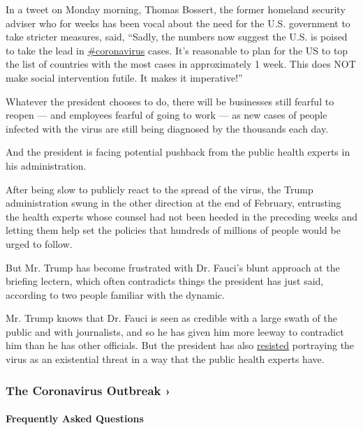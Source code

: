 In a tweet on Monday morning, Thomas Bossert, the former homeland
security adviser who for weeks has been vocal about the need for the
U.S. government to take stricter measures, said, ``Sadly, the numbers
now suggest the U.S. is poised to take the lead in
\href{https://twitter.com/hashtag/coronavirus?src=hashtag_click}{\#coronavirus}
cases. It's reasonable to plan for the US to top the list of countries
with the most cases in approximately 1 week. This does NOT make social
intervention futile. It makes it imperative!''

Whatever the president chooses to do, there will be businesses still
fearful to reopen --- and employees fearful of going to work --- as new
cases of people infected with the virus are still being diagnosed by the
thousands each day.

And the president is facing potential pushback from the public health
experts in his administration.

After being slow to publicly react to the spread of the virus, the Trump
administration swung in the other direction at the end of February,
entrusting the health experts whose counsel had not been heeded in the
preceding weeks and letting them help set the policies that hundreds of
millions of people would be urged to follow.

But Mr. Trump has become frustrated with Dr. Fauci's blunt approach at
the briefing lectern, which often contradicts things the president has
just said, according to two people familiar with the dynamic.

Mr. Trump knows that Dr. Fauci is seen as credible with a large swath of
the public and with journalists, and so he has given him more leeway to
contradict him than he has other officials. But the president has also
\href{https://www.nytimes3xbfgragh.onion/interactive/2020/03/18/us/trump-coronavirus-statements-timeline.html}{resisted}
portraying the virus as an existential threat in a way that the public
health experts have.

\href{https://www.nytimes3xbfgragh.onion/news-event/coronavirus?action=click\&pgtype=Article\&state=default\&region=MAIN_CONTENT_3\&context=storylines_faq}{}

\hypertarget{the-coronavirus-outbreak-}{%
\subsubsection{The Coronavirus Outbreak
›}\label{the-coronavirus-outbreak-}}

\hypertarget{frequently-asked-questions}{%
\paragraph{Frequently Asked
Questions}\label{frequently-asked-questions}}


